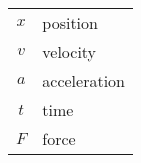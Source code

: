 \begin{tabular}{cp{}}
    $x$ & position \\
    $v$ & velocity \\
    $a$ & acceleration \\
    $t$ & time \\
    $F$ & force
\end{tabular}\\